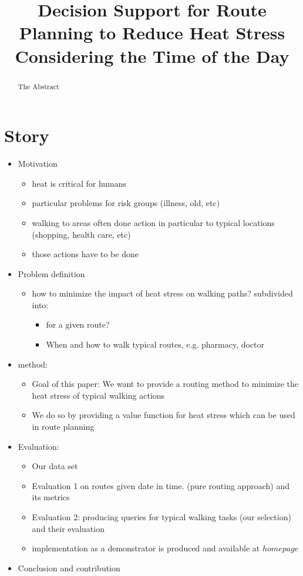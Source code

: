 \documentclass[a4paper]{scrartcl}
\title{Decision Support for Route Planning to Reduce Heat Stress Considering the Time of the Day}
\author{}
\begin{document}
\maketitle

\begin{abstract}
	The Abstract
\end{abstract}

\section{Story}
\begin{itemize}
\item Motivation
\begin{itemize}
\item heat is critical for humans
\item particular problems for risk groups (illness, old, etc)
\item walking to areas often done action in particular to typical locations (shopping, health care, etc)
\item those actions have to be done   
\end{itemize}
\item Problem definition
\begin{itemize}
\item how to minimize the impact of heat stress on walking paths?
\itmem subdivided into:
\begin{itemize}
\item for a given route?
\item When and how to walk typical routes, e.g. pharmacy, doctor
\end{itemize} 
\end{itemize}
\item method:
\begin{itemize}
\item Goal of this paper: We want to provide a routing method to minimize the heat stress of typical walking actions
\item We do so by providing a value function for heat stress which can be used in route planning
\end{itemize}
\item Evaluation:
\begin{itemize}
\item Our data set
\item Evaluation 1 on routes given date in time.  (pure routing approach) and its metrics
\item Evaluation 2: producing queries for typical walking tasks (our selection) and their evaluation
\item implementation as a demonstrator is produced and available at $homepage$
\end{itemize}
\item Conclusion and contribution
\end{itemize}




\printbibliography
\end{document}

